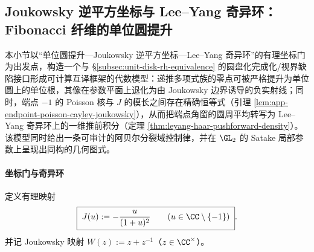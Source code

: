 \subsection{Joukowsky 逆平方坐标与 Lee--Yang 奇异环：Fibonacci 纤维的单位圆提升}\label{subsec:lee-yang-joukowsky-singular-ring}
本小节以“单位圆提升—Joukowsky 逆平方坐标—Lee--Yang 奇异环”的有理坐标门为出发点，构造一个与 \S\ref{subsec:unit-disk-rh-equivalence} 的圆盘化完成化/视界缺陷接口形成可计算互译框架的代数模型：递推多项式族的零点可被严格提升为单位圆上的单位根，其像在参数平面上退化为由 Joukowsky 边界诱导的负实射线；同时，端点 \(-1\) 的 Poisson 核与 \(J\) 的模长之间存在精确恒等式（引理 \ref{lem:app-endpoint-poisson-cayley-joukowsky}），从而把端点角窗的圆周平均转写为 Lee--Yang 奇异环上的一维推前积分（定理 \ref{thm:leyang-haar-pushforward-density}）。
该模型同时给出一条可审计的阿贝尔分裂域控制律，并在 \(\GL_2\) 的 Satake 局部参数上呈现出同构的几何图式。

\paragraph{坐标门与奇异环}
定义有理映射
\begin{equation}\label{eq:lee-yang-J-def}
\boxed{\;
J(u):=-\frac{u}{(1+u)^2}\qquad(u\in\CC\setminus\{-1\})\; }.
\end{equation}
并记 Joukowsky 映射 \(W(z):=z+z^{-1}\)（\(z\in\CC^{\times}\)）。




